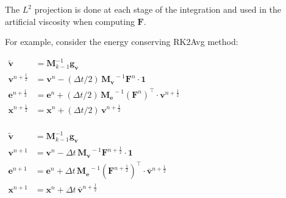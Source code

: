 \documentclass[8pt,xcolor=svgnames]{beamer}
\newcommand{\myem}[1]{{\textcolor{myorange}{#1}}}
\begin{document}
\begin{frame}
\medskip

The $L^2$ projection is done at each stage of the integration and used in the artificial viscosity when computing $\mathbf{F}$.

\medskip

For example, consider the \myem{energy conserving} RK2Avg method:
\begin{center}
\begin{minipage}[c]{0.425\textwidth}\begin{alertblock}{}\centering
$
\begin{aligned}
\mathbf{\tilde v} &= \mathbf{M}_{k-1}^{-1}\mathbf{g_v}\\
\mathbf{v}^{n+\frac{1}{2}} &= \mathbf{v}^{n} - (\Delta t/2)\, \mathbf{M_v}^{\!\!-1} \mathbf{F}^n\cdot \mathbf{1} \\
\mathbf{e}^{n+\frac{1}{2}} &= \mathbf{e}^{n} + (\Delta t/2)\, \mathbf{M_e}^{\!\!-1} (\mathbf{F}^n)^\top \cdot \mathbf{v}^{n+\frac{1}{2}} \\
\mathbf{x}^{n+\frac{1}{2}} &= \mathbf{x}^{n} + (\Delta t/2)\, \mathbf{v}^{n+\frac{1}{2}}\\
\end{aligned}
$
\end{alertblock}\end{minipage}
\hspace{0.09\textwidth}
\begin{minipage}[c]{0.425\textwidth}\begin{alertblock}{}\centering
$
\begin{aligned}
\mathbf{\tilde v} &= \mathbf{M}_{k-1}^{-1}\mathbf{g_v}\\
\mathbf{v}^{n+1} &= \mathbf{v}^{n} - \Delta t\,  \mathbf{M_v}^{\!\!-1} \mathbf{F}^{n+\frac{1}{2}}\cdot \mathbf{1} \\
\mathbf{e}^{n+1} &= \mathbf{e}^{n} + \Delta t\,  \mathbf{M_e}^{\!\!-1} (\mathbf{F}^{n+\frac{1}{2}})^\top \cdot \bar{\mathbf{v}}^{n+\frac{1}{2}} \\
\mathbf{x}^{n+1} &= \mathbf{x}^{n} +  \Delta t\, \bar{\mathbf{v}}^{n+\frac{1}{2}}\\
\end{aligned}
$
\end{alertblock}\end{minipage}
\end{center}
\end{frame}

\end{document}
